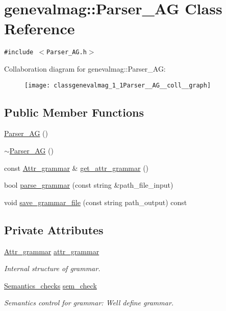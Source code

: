 \hypertarget{classgenevalmag_1_1Parser__AG}{
\section{genevalmag::Parser\_\-AG Class Reference}
\label{classgenevalmag_1_1Parser__AG}
}
{\tt \#include $<$Parser\_\-AG.h$>$}

Collaboration diagram for genevalmag::Parser\_\-AG:\nopagebreak
\begin{figure}[H]
\begin{center}
\leavevmode
\texttt{[image: classgenevalmag\_1\_1Parser\_\_AG\_\_coll\_\_graph]}
\end{center}
\end{figure}
\subsection*{Public Member Functions}
\begin{CompactItemize}
\item 
\hyperlink{classgenevalmag_1_1Parser__AG_107da8e92db8c44204471982619ff339}{Parser\_\-AG} ()
\item 
\hyperlink{classgenevalmag_1_1Parser__AG_834ddbb83e5822f485d16cdc432762cf}{$\sim$Parser\_\-AG} ()
\item 
const \hyperlink{classgenevalmag_1_1Attr__grammar}{Attr\_\-grammar} \& \hyperlink{classgenevalmag_1_1Parser__AG_c6b25c2c2cb50461c50ba50c186a3b42}{get\_\-attr\_\-grammar} ()
\item 
bool \hyperlink{classgenevalmag_1_1Parser__AG_2eda33cb61d0bb2430557ebcad714a10}{parse\_\-grammar} (const string \&path\_\-file\_\-input)
\item 
void \hyperlink{classgenevalmag_1_1Parser__AG_f583d86ffaf791aced12471108590890}{save\_\-grammar\_\-file} (const string path\_\-output) const 
\end{CompactItemize}
\subsection*{Private Attributes}
\begin{CompactItemize}
\item 
\hyperlink{classgenevalmag_1_1Attr__grammar}{Attr\_\-grammar} \hyperlink{classgenevalmag_1_1Parser__AG_f806906189d19d98132d94b2fdf4a7d1}{attr\_\-grammar}
\begin{CompactList}\small\item\em Internal structure of grammar. \item\end{CompactList}\item 
\hyperlink{classgenevalmag_1_1Semantics__checks}{Semantics\_\-checks} \hyperlink{classgenevalmag_1_1Parser__AG_0ae8c86d8db3e9e354377588754559fe}{sem\_\-check}
\begin{CompactList}\small\item\em Semantics control for grammar: Well define grammar. \item\end{CompactList}\end{CompactItemize}


